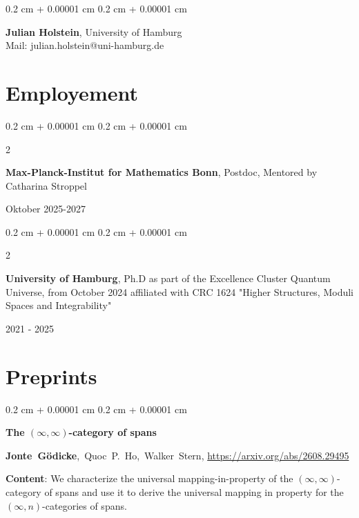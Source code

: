 \documentclass[10pt, letterpaper]{article}
\newenvironment{onecolentry}{
    \begin{adjustwidth}{
        0.2 cm + 0.00001 cm
    }{
        0.2 cm + 0.00001 cm
    }
}{
    \end{adjustwidth}
} %
\newenvironment{twocolentry}[2][]{
    \onecolentry
    \def\secondColumn{#2}
    \setcolumnwidth{\fill, 4.5 cm}
    \begin{paracol}{2}
}{
    \switchcolumn \raggedleft \secondColumn
    \end{paracol}
    \endonecolentry
} %
\begin{document}
\begin{onecolentry}
    \textbf{Julian Holstein}, University of Hamburg \\
    Mail: julian.holstein@uni-hamburg.de 
\end{onecolentry}




\section{Employement}

\begin{twocolentry}
    {Oktober 2025-2027}
    {\textbf{Max-Planck-Institut for Mathematics Bonn}, Postdoc, Mentored by Catharina Stroppel}
\end{twocolentry}

\vspace{0.2cm}

\begin{twocolentry}{

     2021 - 2025
           
        }
            \textbf{University of Hamburg}, Ph.D as part of the Excellence Cluster Quantum Universe,
             from October 2024 affiliated with CRC 1624 "Higher Structures, Moduli Spaces and Integrability"
\end{twocolentry}


    
\section{Preprints}

\begin{onecolentry}
                \textbf{The $(\infty,\infty)$-category of spans}

                \vspace{0.10 cm}

                \mbox{\textbf{Jonte Gödicke}, Quoc P. Ho, Walker Stern}, \url{https://arxiv.org/abs/2608.29495}

                \vspace{0.10cm}
                
                \textbf{Content}: We characterize the universal mapping-in-property of the $(\infty,\infty)$-category of spans and use it to derive the universal mapping in property for the $(\infty,n)$-categories of spans. 
                \vspace{0.10 cm}

\end{onecolentry}
\vspace{0.2cm}
\end{document}
